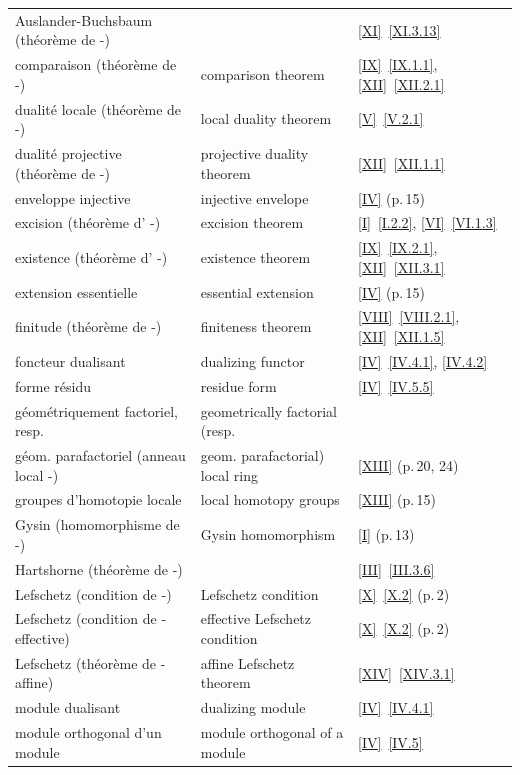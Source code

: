 \begin{footnotesize}
\noindent
\begin{tabular}{lll}
Auslander-Buchsbaum (th\'eor\`eme de -) & & \ref{XI}~\ref{XI.3.13}\\
comparaison (th\'eor\`eme de -) & comparison theorem & \ref{IX}~\ref{IX.1.1}, \ref{XII}~\ref{XII.2.1}\\
dualit\'e locale (th\'eor\`eme de -) & local duality theorem & \ref{V}~\ref{V.2.1}\\
dualit\'e projective (th\'eor\`eme de -) & projective duality theorem & \ref{XII}~\ref{XII.1.1} \\
enveloppe injective & injective envelope & \ref{IV} (p.\,15)\\
excision (th\'eor\`eme d' -) & excision theorem & \ref{I}~\ref{I.2.2}, \ref{VI}~\ref{VI.1.3}\\
existence (th\'eor\`eme d' -) & existence theorem & \ref{IX}~\ref{IX.2.1}, \ref{XII}~\ref{XII.3.1}\\
extension essentielle & essential extension & \ref{IV} (p.\,15)\\
finitude (th\'eor\`eme de -) & finiteness theorem & \ref{VIII}~\ref{VIII.2.1}, \ref{XII}~\ref{XII.1.5}\\
foncteur dualisant & dualizing functor & \ref{IV}~\ref{IV.4.1}, \ref{IV.4.2}\\
forme r\'esidu & residue form & \ref{IV}~\ref{IV.5.5}\\
g\'eom\'etriquement factoriel, resp. & geometrically factorial (resp. &\\
g\'eom. parafactoriel (anneau local -) & geom. parafactorial) local ring & \ref{XIII} (p.\,20, 24)\\
groupes d'homotopie locale & local homotopy groups & \ref{XIII} (p.\,15)\\
Gysin (homomorphisme de -) & Gysin homomorphism & \ref{I} (p.\,13)\\
Hartshorne (th\'eor\`eme de -) & & \ref{III}~\ref{III.3.6}\\
Lefschetz (condition de -) & Lefschetz condition & \ref{X}~\ref{X.2} (p.\,2)\\
Lefschetz (condition de - effective) & effective Lefschetz condition & \ref{X}~\ref{X.2} (p.\,2)\\
Lefschetz (th\'eor\`eme de - affine) & affine Lefschetz theorem & \ref{XIV}~\ref{XIV.3.1}\\
module dualisant & dualizing module & \ref{IV}~\ref{IV.4.1}\\
module orthogonal d'un module & module orthogonal of a module & \ref{IV}~\ref{IV.5}\\

\end{tabular}
\end{footnotesize}
